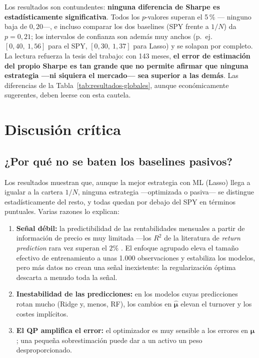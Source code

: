 Los resultados son contundentes: \textbf{ninguna diferencia de Sharpe es
estadísticamente significativa}. Todos los $p$-valores superan el 5\,\% ---
ninguno baja de $0{,}20$---, e incluso comparar los dos baselines (SPY frente a
$1/N$) da $p = 0{,}21$; los intervalos de confianza son además muy anchos (p.\
ej.\ $[0{,}40,\ 1{,}56]$ para el SPY, $[0{,}30,\ 1{,}37]$ para Lasso) y se
solapan por completo. La lectura refuerza la tesis del trabajo: con 143 meses,
\textbf{el error de estimación del propio Sharpe es tan grande que no permite
afirmar que ninguna estrategia ---ni siquiera el mercado--- sea superior a las
demás}. Las diferencias de la Tabla~\ref{tab:resultados-globales}, aunque
económicamente sugerentes, deben leerse con esta cautela.

\section{Discusión crítica}

\subsection{¿Por qué no se baten los baselines pasivos?}

Los resultados muestran que, aunque la mejor estrategia con ML (Lasso) llega a
igualar a la cartera $1/N$, ninguna estrategia ---optimizada o pasiva--- se
distingue estadísticamente del resto, y todas quedan por debajo del SPY en
términos puntuales. Varias razones lo explican:

\begin{enumerate}
    \item \textbf{Señal débil:} la predictibilidad de las rentabilidades
          mensuales a partir de información de precio es muy limitada ---los
          $R^2$ de la literatura de \textit{return prediction} rara vez superan
          el $2\%$ \cite{Gu2020}. El enfoque agrupado eleva el tamaño efectivo
          de entrenamiento a unas 1.000 observaciones y estabiliza los modelos,
          pero más datos no crean una señal inexistente: la regularización
          óptima descarta a menudo toda la señal.
    \item \textbf{Inestabilidad de las predicciones:} en los modelos cuyas
          predicciones rotan mucho (Ridge y, menos, RF), los cambios en
          $\hat{\boldsymbol{\mu}}$ elevan el turnover y los costes implícitos.
    \item \textbf{El QP amplifica el error:} el optimizador es muy sensible a
          los errores en $\boldsymbol{\mu}$ \cite{Merton1980}; una pequeña
          sobrestimación puede dar a un activo un peso desproporcionado.
\end{enumerate}

